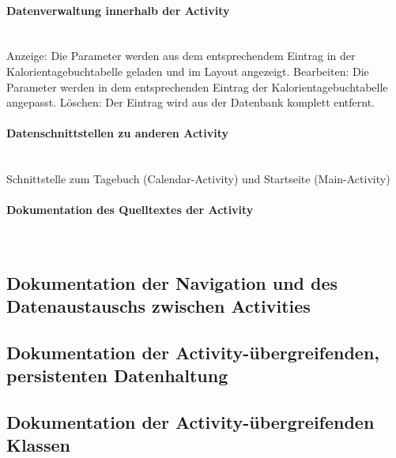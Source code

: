 \paragraph{Datenverwaltung innerhalb der Activity}\\
Anzeige: Die Parameter werden aus dem entsprechendem Eintrag in der Kalorientagebuchtabelle geladen und im Layout angezeigt. 
Bearbeiten: Die Parameter werden in dem entsprechenden Eintrag der Kalorientagebuchtabelle angepasst.
Löschen: Der Eintrag wird aus der Datenbank komplett entfernt. 

\paragraph{Datenschnittstellen zu anderen Activity}\\
Schnittstelle zum Tagebuch (Calendar-Activity) und Startseite (Main-Activity)

\paragraph{Dokumentation des Quelltextes der Activity}\\



\subsection{Dokumentation der Navigation und des Datenaustauschs zwischen
Activities}

\subsection{Dokumentation der Activity-übergreifenden, persistenten Datenhaltung}

\subsection{Dokumentation der Activity-übergreifenden Klassen}
